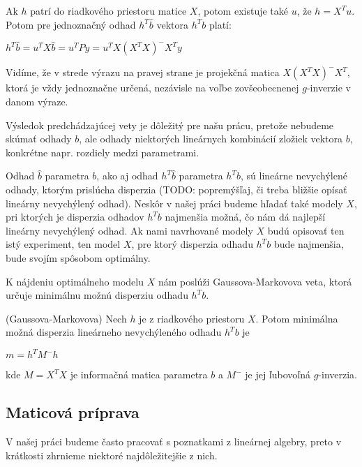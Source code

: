 Ak $h$ patrí do riadkového priestoru matice $X$, potom existuje také $u$, že $h = X^T u$.
Potom pre jednoznačný odhad $h^T \hat{b}$ vektora $h^T b$ platí:

\begin{center}
$h^T \hat{b} = u^T X \hat{b} = u^T P y = u^T X(X^T X)^- X^T y$
\end{center}

Vidíme, že v strede výrazu na pravej strane je projekčná matica $X(X^T X)^- X^T$, ktorá je vždy jednoznačne určená, 
nezávisle na voľbe zovšeobecnenej $g$-inverzie v danom výraze.

Výsledok predchádzajúcej vety je dôležitý pre našu prácu, pretože nebudeme skúmať odhady $b$,
ale odhady niektorých lineárnych kombinácií zložiek vektora $b$, 
konkrétne napr. rozdiely medzi parametrami.

Odhad $\hat{b}$ parametra $b$, ako aj odhad $h^T \hat{b}$ parametra $h^T b$, sú lineárne nevychýlené odhady,
ktorým prislúcha disperzia (TODO: popremýšľaj, či treba bližšie opísať lineárny nevychýlený odhad). 
Neskôr v našej práci budeme hľadať také modely $X$, pri ktorých je disperzia odhadov $h^T b$ najmenšia možná,
čo nám dá najlepší lineárny nevychýlený odhad. 
Ak nami navrhované modely $X$ budú opisovať ten istý experiment, ten model $X$,
pre ktorý disperzia odhadu $h^T b$ bude najmenšia, bude svojím spôsobom optimálny.

K nájdeniu optimálneho modelu $X$ nám poslúži Gaussova-Markovova veta, 
ktorá určuje minimálnu možnú disperziu odhadu $h^T b$.

\begin{theorem}
\label{gauss-markov}
(Gaussova-Markovova) Nech $h$ je z riadkového priestoru $X$. 
Potom minimálna možná disperzia lineárneho nevychýleného odhadu $h^T b$ je

\begin{center}
$
m = h^T M^- h
$
\end{center}

kde $M = X^T X$ je informačná matica parametra $b$ a $M^-$ je jej ľubovoľná $g$-inverzia.
\end{theorem}

\subsection{Maticová príprava}

V našej práci budeme často pracovať s poznatkami z lineárnej algebry, preto v krátkosti zhrnieme niektoré najdôležitejšie z nich.

